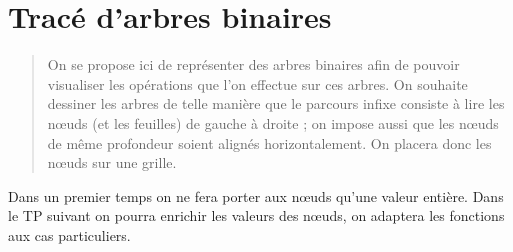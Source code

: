 \chapter{Tracé d'arbres binaires}
\thispagestyle{empty}
\begin{abstract}
On se propose ici de représenter des arbres binaires afin de pouvoir visualiser les opérations que l'on effectue sur ces arbres. On souhaite  dessiner les arbres de telle manière que le parcours infixe consiste à lire les nœuds (et les feuilles) de gauche à droite ; on impose aussi que les nœuds de même profondeur soient alignés horizontalement. On placera donc les nœuds sur une grille.
\end{abstract}

Dans un premier temps on ne fera porter aux nœuds qu'une valeur entière. Dans le TP suivant on pourra enrichir les valeurs des nœuds, on adaptera les fonctions aux cas particuliers. 

